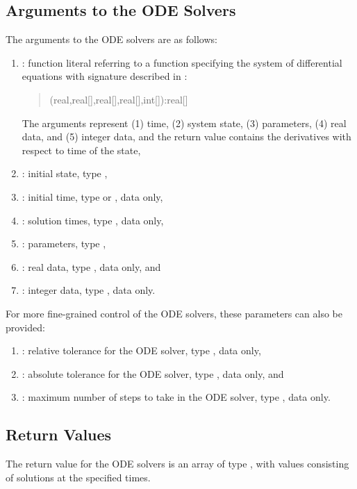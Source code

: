 \subsection{Arguments to the ODE Solvers}

The arguments to the ODE solvers are as follows:
%
\begin{enumerate}
\item {}: function literal referring to a function specifying
  the system of differential equations with signature described in
  :
  \begin{quote}
    (real,real[],real[],real[],int[]):real[]
  \end{quote}
  The arguments represent (1) time, (2) system state, (3) parameters,
  (4) real data, and (5) integer data, and the return value contains the
  derivatives with respect to time of the state,
\item {}: initial state, type ,
\item {}: initial time, type  or , data only,
\item {}: solution times, type , data only,
\item {}: parameters, type ,
\item {}: real data, type , data only, and
\item {}: integer data, type , data only.
\end{enumerate}

For more fine-grained control of the ODE solvers, these parameters can
also be provided:
\begin{enumerate}
  \addtocounter{enumi}{7}
\item {}: relative tolerance for the ODE
  solver, type , data only,
\item {}: absolute tolerance for the ODE
  solver, type , data only, and
\item {}: maximum number of steps to take in the
  ODE solver, type , data only.
\end{enumerate}
%

\subsection{Return Values}

The return value for the ODE solvers is an array of type
, with values consisting of solutions at the specified
times.

